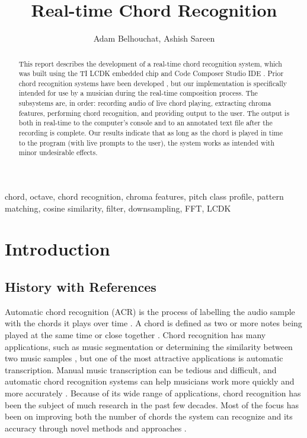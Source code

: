 \documentclass[journal]{IEEEtran}
\begin{document}
\title{Real-time Chord Recognition}
\author{Adam Belhouchat, Ashish Sareen}
\maketitle

\begin{abstract}
    This report describes the development of a real-time chord recognition system, which was built using the TI LCDK embedded chip \cite{lcdk} and Code Composer Studio IDE \cite{ccs}.
    Prior chord recognition systems have been developed \cite{stark, cho, harte, lee, mauch_thesis, mauch_simultaneous, jiang, pauwels, fujishima}, but our implementation is specifically intended for use by a musician during the real-time composition process.
    The subsystems are, in order: recording audio of live chord playing, extracting chroma features, performing chord recognition, and providing output to the user.
    The output is both in real-time to the computer’s console and to an annotated text file after the recording is complete.
    Our results indicate that as long as the chord is played in time to the program (with live prompts to the user), the system works as intended with minor undesirable effects.
\end{abstract}
\begin{IEEEkeywords}
    chord, octave, chord recognition, chroma features, pitch class profile, pattern matching, cosine similarity, filter, downsampling, FFT, LCDK
\end{IEEEkeywords}

\section{Introduction}
\subsection{History with References}
Automatic chord recognition (ACR) is the process of labelling the audio sample with the chords it plays over time \cite{stark}.
A chord is defined as two or more notes being played at the same time or close together \cite{cho}.
Chord recognition has many applications, such as music segmentation or determining the similarity between two music samples \cite{lee}, but one of the most attractive applications is automatic transcription.
Manual music transcription can be tedious and difficult, and automatic chord recognition systems can help musicians work more quickly and more accurately \cite{mauch_thesis}.
Because of its wide range of applications, chord recognition has been the subject of much research in the past few decades.
Most of the focus has been on improving both the number of chords the system can recognize and its accuracy through novel methods and approaches \cite{pauwels}.
\end{document}
